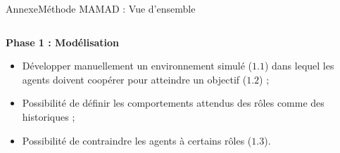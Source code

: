 \begin{frame}{Annexe}{Méthode MAMAD : Vue d’ensemble}

    \begin{columns}

        \begin{column}{0.6\textwidth}

            \textbf{Phase 1 : Modélisation}

            \begin{itemize}
                \item Développer manuellement un environnement simulé ($1.1$) dans lequel les agents doivent coopérer pour atteindre un objectif ($1.2$) ;
                \item Possibilité de définir les comportements attendus des rôles comme des historiques ;
                \item Possibilité de contraindre les agents à certains rôles ($1.3$).
            \end{itemize}

        \end{column}


\end{columns}
\end{frame}
